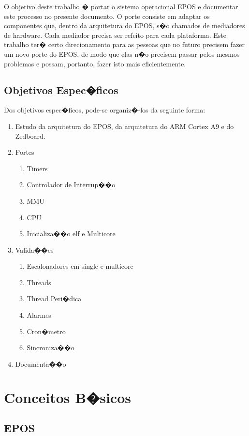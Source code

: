 \documentclass{ufscThesis/ufscThesis} %
\begin{document}
O objetivo deste trabalho � portar o sistema operacional EPOS e documentar este processo no presente documento. O porte consiste em adaptar os componentes que, dentro da arquitetura do EPOS, s�o chamados de mediadores de hardware. Cada mediador precisa ser refeito para cada plataforma.
Este trabalho ter� certo direcionamento para as pessoas que no futuro precisem fazer um novo porte do EPOS, de modo que elas n�o precisem passar pelos mesmos problemas e possam, portanto, fazer isto mais eficientemente.

\section{Objetivos Espec�ficos}
Dos objetivos espec�ficos, pode-se organiz�-los da seguinte forma:

\begin{enumerate}
    \item Estudo da arquitetura do EPOS, da arquitetura do ARM Cortex A9 e do Zedboard.
    \item Portes
    \begin{enumerate}
        \item Timers
        \item Controlador de Interrup��o
        \item MMU
        \item CPU
        \item Inicializa��o elf e Multicore
    \end{enumerate}
    \item Valida��es
    \begin{enumerate}
        \item Escalonadores em single e multicore
        \item Threads
        \item Thread Peri�dica
        \item Alarmes
        \item Cron�metro
        \item Sincroniza��o
    \end{enumerate}
    \item Documenta��o
\end{enumerate}

\chapter{Conceitos B�sicos}

\section{EPOS}
\end{document}
